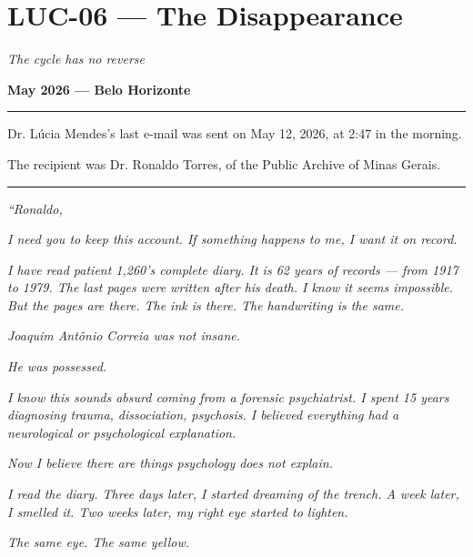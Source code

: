 \section*{\textbf{LUC-06} --- The Disappearance}

\noindent \textit{The cycle has no reverse}

\noindent \textbf{May 2026 --- Belo Horizonte}

\vspace{0.5em}\noindent\rule{\textwidth}{0.5pt}\vspace{0.5em}

\noindent Dr. Lúcia Mendes's last e-mail was sent on May 12, 2026, at 2:47 in the morning.

\noindent The recipient was Dr. Ronaldo Torres, of the Public Archive of Minas Gerais.

\vspace{0.5em}\noindent\rule{\textwidth}{0.5pt}\vspace{0.5em}

\noindent \textit{\textquotedblleft{}Ronaldo,}

\noindent \textit{I need you to keep this account. If something happens to me, I want it on record.}

\noindent \textit{I have read patient 1,260's complete diary. It is 62 years of records --- from 1917 to 1979. The last pages were written after his death. I know it seems impossible. But the pages are there. The ink is there. The handwriting is the same.}

\noindent \textit{Joaquim Antônio Correia was not insane.}

\noindent \textit{He was possessed.}

\noindent \textit{I know this sounds absurd coming from a forensic psychiatrist. I spent 15 years diagnosing trauma, dissociation, psychosis. I believed everything had a neurological or psychological explanation.}

\noindent \textit{Now I believe there are things psychology does not explain.}

\noindent \textit{I read the diary. Three days later, I started dreaming of the trench. A week later, I smelled it. Two weeks later, my right eye started to lighten.}

\noindent \textit{The same eye. The same yellow.}

